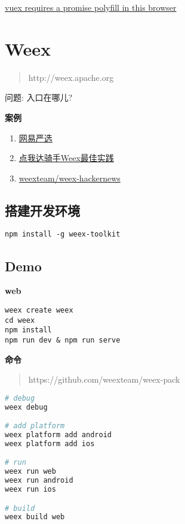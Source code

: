 \href{https://github.com/vuejs-templates/webpack/issues/474}{vuex
requires a promise polyfill in this browser}

\section{Weex}\label{weex}

\begin{quote}
http://weex.apache.org
\end{quote}

问题: 入口在哪儿?

\textbf{案例}

\begin{enumerate}
\def\labelenumi{\arabic{enumi}.}
\tightlist
\item
  \href{https://github.com/zwwill/yanxuan-weex-demo}{网易严选}
\item
  \href{https://mp.weixin.qq.com/s/dowOE_QpZrtV5GH9EAgyHg}{点我达骑手Weex最佳实践}
\item
  \href{https://github.com/weexteam/weex-hackernews}{weexteam/weex-hackernews}
\end{enumerate}

\subsection{搭建开发环境}\label{ux642dux5efaux5f00ux53d1ux73afux5883}

\begin{lstlisting}
npm install -g weex-toolkit
\end{lstlisting}

\subsection{Demo}\label{demo}

\textbf{web}

\begin{lstlisting}
weex create weex
cd weex
npm install
npm run dev & npm run serve
\end{lstlisting}

\textbf{命令}

\begin{quote}
https://github.com/weexteam/weex-pack
\end{quote}

\begin{lstlisting}[language=bash]
# debug
weex debug

# add platform
weex platform add android
weex platform add ios

# run
weex run web
weex run android
weex run ios

# build
weex build web
\end{lstlisting}

